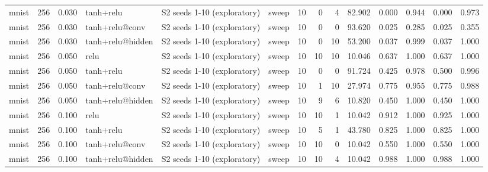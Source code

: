 \begin{table}[htbp]
{\begin{tabular}{@{}lrrlllrrrrrrrr@{}}
mnist & 256 & 0.030 & tanh+relu & S2 seeds 1-10 (exploratory) & sweep & 10 & 0 & 4 & 82.902 & 0.000 & 0.944 & 0.000 & 0.973 \\
mnist & 256 & 0.030 & tanh+relu@conv & S2 seeds 1-10 (exploratory) & sweep & 10 & 0 & 0 & 93.620 & 0.025 & 0.285 & 0.025 & 0.355 \\
mnist & 256 & 0.030 & tanh+relu@hidden & S2 seeds 1-10 (exploratory) & sweep & 10 & 0 & 10 & 53.200 & 0.037 & 0.999 & 0.037 & 1.000 \\
mnist & 256 & 0.050 & relu & S2 seeds 1-10 (exploratory) & sweep & 10 & 10 & 10 & 10.046 & 0.637 & 1.000 & 0.637 & 1.000 \\
mnist & 256 & 0.050 & tanh+relu & S2 seeds 1-10 (exploratory) & sweep & 10 & 0 & 0 & 91.724 & 0.425 & 0.978 & 0.500 & 0.996 \\
mnist & 256 & 0.050 & tanh+relu@conv & S2 seeds 1-10 (exploratory) & sweep & 10 & 1 & 10 & 27.974 & 0.775 & 0.955 & 0.775 & 0.988 \\
mnist & 256 & 0.050 & tanh+relu@hidden & S2 seeds 1-10 (exploratory) & sweep & 10 & 9 & 6 & 10.820 & 0.450 & 1.000 & 0.450 & 1.000 \\
mnist & 256 & 0.100 & relu & S2 seeds 1-10 (exploratory) & sweep & 10 & 10 & 1 & 10.042 & 0.912 & 1.000 & 0.925 & 1.000 \\
mnist & 256 & 0.100 & tanh+relu & S2 seeds 1-10 (exploratory) & sweep & 10 & 5 & 1 & 43.780 & 0.825 & 1.000 & 0.825 & 1.000 \\
mnist & 256 & 0.100 & tanh+relu@conv & S2 seeds 1-10 (exploratory) & sweep & 10 & 10 & 0 & 10.042 & 0.550 & 1.000 & 0.550 & 1.000 \\
mnist & 256 & 0.100 & tanh+relu@hidden & S2 seeds 1-10 (exploratory) & sweep & 10 & 10 & 4 & 10.042 & 0.988 & 1.000 & 0.988 & 1.000 \\
\bottomrule
\end{tabular}}
\end{table}
